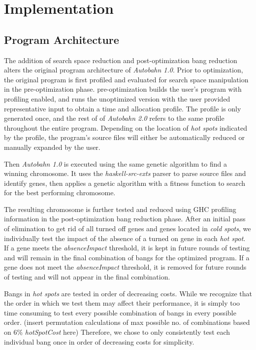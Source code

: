 \documentclass[format=sigplan]{acmart}
\newcommand{\hotspot}[0]{\textit{hot spot}}
\newcommand{\hotspots}[0]{\textit{hot spots}}
\newcommand{\coldspots}[0]{\textit{cold spots}}
\newcommand{\hotspotcost}[0]{\textit{hotSpotCost}}
\newcommand{\Ao}[0]{\textit{Autobahn 1.0}}
\newcommand{\At}[0]{\textit{Autobahn 2.0}}
\newcommand{\preopt}[0]{pre-optimization}
\newcommand{\postopt}[0]{post-optimization}
\newcommand{\absim}[0]{\textit{absenceImpact}}
\begin{document}
\section{Implementation}

\subsection{Program Architecture}

The addition of search space reduction and \postopt{} bang reduction alters the original program architecture of \Ao{}. Prior to optimization, the original program is first profiled and evaluated for search space manipulation in the \preopt{} phase. \preopt{} builds the user's program with profiling enabled, and runs the unoptimized version with the user provided representative input to obtain a time and allocation profile. The profile is only generated once, and the rest of of \At{} refers to the same profile throughout the entire program. Depending on the location of \hotspots{} indicated by the profile, the program's source files will either be automatically reduced or manually expanded by the user. 

Then \Ao{} is executed using the same genetic algorithm to find a winning chromosome. It uses the \textit{haskell-src-exts} parser to parse source files and identify genes, then applies a genetic algorithm with a fitness function to search for the best performing chromosome.

The resulting chromosome is further tested and reduced using GHC profiling information in the \postopt{} bang reduction phase. After an initial pass of elimination to get rid of all turned off genes and genes located in \coldspots{}, we individually test the impact of the absence of a turned on gene in each \hotspot{}. If a gene meets the \absim{} threshold, it is kept in future rounds of testing and will remain in the final combination of bangs for the optimized program. If a gene does not meet the \absim{} threshold, it is removed for future rounds of testing and will not appear in the final combination. 

Bangs in \hotspots{} are tested in order of decreasing costs. While we recognize that the order in which we test them may affect their performance, it is simply too time consuming to test every possible combination of bangs in every possible order. (insert permutation calculations of max possible no. of combinations based on 6\% \hotspotcost{} here) Therefore, we chose to only consistently test each individual bang once in order of decreasing costs for simplicity. 
\end{document}
